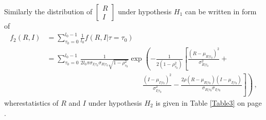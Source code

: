 Similarly the distribution of  
$\begin{bmatrix}
  R \\
  I
\end{bmatrix}$
under hypothesis $H_1$ can be written in form of 
\begin{equation}
  \begin{split}
  f_2(R, I) &= \sum_{\tau_0 = 0}^{l_0-1} \frac{1}{l_0}f(R, I|\tau=\tau_0)\\
  &= \sum_{\tau_0 = 0}^{l_0-1}\frac{1}{2l_0\pi\sigma_{I|\tau_0}\sigma_{R|\tau_0}\sqrt{1 - \rho_{\tau_0}^2}}\exp\left( -\frac{1}{2(1-\rho_{\tau_0}^2)}\left[ \frac{(R-\mu_{R|\tau_0})^2}{\sigma_{R|\tau_0}^2} + \right.\right.\\
  & \left. \left. \;\;\;\;\;\;\;\;\;\;\;\;\;\;\;\; \;\;\;\;\;\;\;\;\;\;\;\;\;\;\;\; \;\;\;\;\;\;\;\;\;\;\;\;\;\;\;\; \frac{(I-\mu_{I|\tau_0})^2}{\sigma_{I|\tau_0}^2} - \frac{2\rho(R-\mu_{R|\tau_0})(I-\mu_{I|\tau_0})}{\sigma_{R|\tau_0}\sigma_{I|\tau_0}}\right] \right)\,,
\end{split}
  \label{f_1underH1}
\end{equation}
wherestatistics of $R$ and $I$ under hypothesis $H_2$ is given in Table \ref{Table3} on page \pageref{Table3}. 

